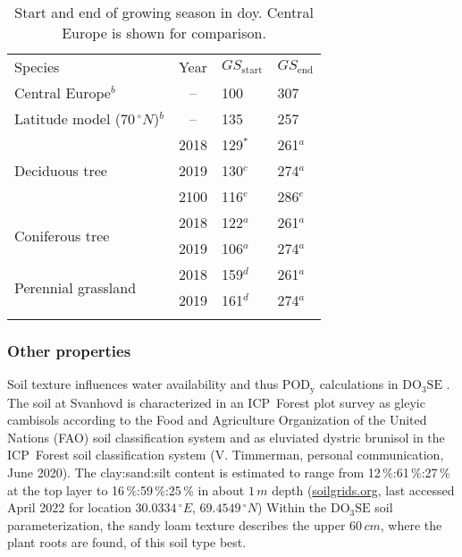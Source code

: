\documentclass[bg, manuscript]{copernicus}
\begin{document}
\begin{table}[t]
  \caption{Start and end of growing season in \unit{doy}. Central Europe is shown for comparison.}
  \label{tab:sensitivity_tests_gs}
  \begin{tabular}{lcll}
    \tophline
    Species & Year & $GS_\mathrm{start}$ & $GS_\mathrm{end}$\\
    \middlehline
    Central Europe$^b$ & -- & 100 & 307\\
    Latitude model ($70\,\unit{^\circ N}$)$^b$ & -- & 135 & 257\\
    \multirow{3}{*}{Deciduous tree} & 2018 & 129$^*$ & 261$^a$ \\
    & 2019 & 130$^c$ & 274$^a$ \\
    & 2100 & 116$^e$ & 286$^e$ \\
    \multirow{2}{*}{Coniferous tree} & 2018 & 122$^a$ & 261$^a$ \\
    & 2019 & 106$^a$ & 274$^a$ \\
    \multirow{2}{*}{Perennial grassland} & 2018 & 159$^d$ & 261$^a$\\
    & 2019 & 161$^d$ & 274$^a$ \\
    \bottomhline
  \end{tabular}
\end{table}

\subsubsection{Other properties}
\label{subsec:soil}

Soil texture influences water availability and thus $\mathrm{POD_y}$ calculations in $\mathrm{DO_3SE}$ \citep{ACP:Bueker2012}. The soil at Svanhovd is characterized in an ICP~Forest plot survey as gleyic cambisols according to the Food and Agriculture Organization of the United Nations (FAO) soil classification system and as eluviated dystric brunisol in the ICP~Forest soil classification system (V. Timmerman, personal communication, June 2020). The clay:sand:silt content is estimated to range from 12\,\%:61\,\%:27\,\% at the top layer to 16\,\%:59\,\%:25\,\% in about $1\,\unit{m}$ depth (\href{https://soilgrids.org/}{soilgrids.org}, last accessed April 2022 for location $30.0334\,\unit{^\circ E}$, $69.4549\,\unit{^\circ N}$) Within the $\mathrm{DO_3SE}$ soil parameterization, the sandy loam texture describes the upper $60\,\unit{cm}$, where the plant roots are found, of this soil type best. 
\end{document}
